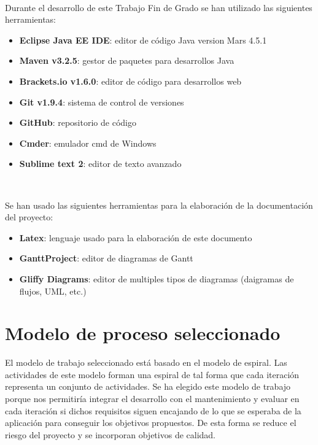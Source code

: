        \vspace{0.7cm}
\\
\thispagestyle{empty}

Durante el desarrollo de este Trabajo Fin de Grado se han utilizado las siguientes herramientas:

\begin{itemize}
       \item {\bfseries Eclipse Java EE IDE}: editor de código Java version Mars 4.5.1
       \item {\bfseries Maven v3.2.5}: gestor de paquetes para desarrollos Java
       \item {\bfseries Brackets.io v1.6.0}: editor de código para desarrollos web
       \item {\bfseries Git v1.9.4}: sistema de control de versiones
       \item {\bfseries GitHub}: repositorio de código
       \item {\bfseries Cmder}: emulador cmd de Windows 
       \item {\bfseries Sublime text 2}: editor de texto avanzado
\end{itemize}


       \vspace{0.7cm}
\\
\thispagestyle{empty}

Se han usado las siguientes herramientas para la elaboración de la documentación del proyecto:

\begin{itemize}
       \item {\bfseries Latex}: lenguaje usado para la elaboración de este documento
       \item {\bfseries GanttProject}: editor de diagramas de Gantt
       \item {\bfseries Gliffy Diagrams}: editor de multiples tipos de diagramas (daigramas de flujos, UML, etc.)
\end{itemize}


\section{Modelo de proceso seleccionado}
\thispagestyle{empty}


El modelo de trabajo seleccionado está basado en el modelo de espiral. Las actividades de este modelo forman una espiral de tal forma que cada iteración representa un conjunto de actividades. Se ha elegido este modelo de trabajo porque nos permitiría integrar el desarrollo con el mantenimiento y evaluar en cada iteración si dichos requisitos siguen encajando de lo que se esperaba de la aplicación para conseguir los objetivos propuestos. De esta forma se reduce el riesgo del proyecto y se incorporan objetivos de calidad.

